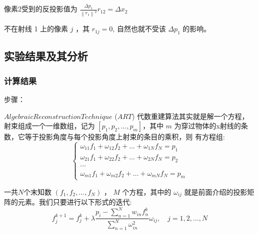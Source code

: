 \documentclass[hyperref]{ctexart}
\begin{document}
				像素2受到的反投影值为 $\frac{\Delta p_{1}}{\left\|r_{1}\right\|^{2}} r_{12}=\Delta x_{2}$

				不在射线 1 上的像素 $j$ ，其 $r_{1 j}=0$, 自然也就不受该 $\Delta p_{1}$ 的影响。

			
		\subsection{实验结果及其分析}

			\subsubsection{计算结果}
				步骤：
	
    			$Algebraic Reconstruction Technique$ ($ART$) 代数重建算法其实就是解一个方程，射束组成一个一维数组，记为 $\left[p_{1}, p_{2}, \ldots, p_{m}\right]$，其中 $m$ 为穿过物体的x射线的条数，它等于投影角度与每个投影角度上射束的条目的乘积，则 有方程组:
		    \begin{equation}
			     \left\{\begin{array}{l}
			     \omega_{11} f_{1}+\omega_{12} f_{2}+\ldots+\omega_{1 N} f_{N}=p_{1} \\
			     \omega_{21} f_{1}+\omega_{22} f_{2}+\ldots+\omega_{2 N} f_{N}=p_{2} \\
			     \cdots \\
			     \omega_{m 1} f_{1}+\omega_{m 2} f_{2}+\ldots+\omega_{m N} f_{N}=p_{m}
			     \end{array}\right.
		    \end{equation}

    			一共$N$个末知数 $\left(f_{1}, f_{2}, \ldots, f_{N}\right)$ ， $M$ 个方程，其中的 $\omega_{i j}$ 就是前面介绍的投影矩阵的元素。我们只要进行以下形式的迭代:
		    \begin{equation}
			     f_{j}^{k+1}=f_{j}^{k}+\lambda \frac{p_{i}-\sum_{n=1}^{N} w_{i n} f_{n}^{k}}{\sum_{n=1}^{N} \omega_{i n}^{2}} \omega_{i j}, \quad j=1,2, \ldots, N
		    \end{equation}
    			
\end{document}

